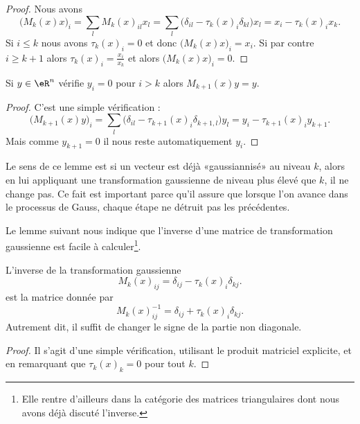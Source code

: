 \begin{proof}
	Nous avons
	\begin{equation}
		\big( M_k(x)x \big)_i=\sum_lM_k(x)_{il}x_l=\sum_l\big( \delta_{il}-\tau_k(x)_i\delta_{kl} \big)x_l=x_i-\tau_k(x)_ix_k.
	\end{equation}
	Si \( i\leq k\) nous avons \( \tau_k(x)_i=0\) et donc \(  \big( M_k(x)x \big)_i=x_i   \). Si par contre \( i\geq k+1\) alors \( \tau_k(x)_i=\frac{ x_i }{ x_k }\) et alors \( \big( M_k(x)x \big)_i=0\).
\end{proof}

\begin{lemma}       \label{LEMooPFWWooUmMsVH}
	Si \( y\in \eR^n\) vérifie \( y_i=0\) pour \( i>k\) alors \( M_{k+1}(x)y=y\).
\end{lemma}

\begin{proof}
	C'est une simple vérification :
	\begin{equation}
		\big( M_{k+1}(x)y \big)_i=\sum_l\big( \delta_{il}-\tau_{k+1}(x)_i\delta_{k+1,l} \big)y_l=y_i-\tau_{k+1}(x)_iy_{k+1}.
	\end{equation}
	Mais comme \( y_{k+1}=0\) il nous reste automatiquement \( y_i\).
\end{proof}
Le sens de ce lemme est si un vecteur est déjà «gaussiannisé» au niveau \( k\), alors en lui appliquant une transformation gaussienne de niveau plus élevé que \( k\), il ne change pas. Ce fait est important parce qu'il assure que lorsque l'on avance dans le processus de Gauss, chaque étape ne détruit pas les précédentes.

Le lemme suivant nous indique que l'inverse d'une matrice de transformation gaussienne est facile à calculer\footnote{Elle rentre d'ailleurs dans la catégorie des matrices triangulaires dont nous avons déjà discuté l'inverse.}.

\begin{lemma}       \label{LEMooFHZDooZiKdbr}
	L'inverse de la transformation gaussienne
	\begin{equation}
		M_k(x)_{ij}=\delta_{ij}-\tau_k(x)_i\delta_{kj}.
	\end{equation}
	est la matrice donnée par
	\begin{equation}
		M_k(x)^{-1}_{ij}=\delta_{ij}+\tau_k(x)_i\delta_{kj}.
	\end{equation}
	Autrement dit, il suffit de changer le signe de la partie non diagonale.
\end{lemma}

\begin{proof}
	Il s'agit d'une simple vérification, utilisant le produit matriciel explicite, et en remarquant que \( \tau_k(x)_k=0\) pour tout \( k\).
\end{proof}

